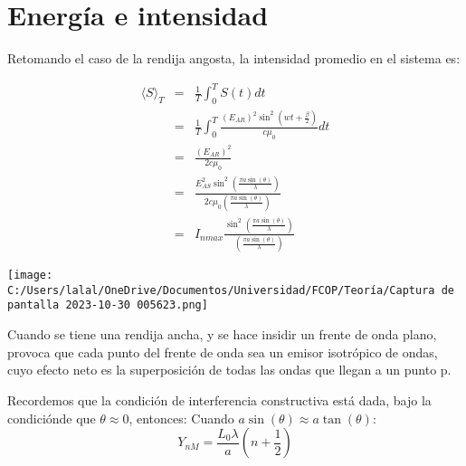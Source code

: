 \documentclass{article}
\begin{document}
        \section{Energía e intensidad}
        Retomando el caso de la rendija angosta, la intensidad 
        promedio en el sistema es:

        \begin{eqnarray}
            \langle S \rangle_T &=& 
            \frac{1}{T} \int_{0}^{T} S(t)dt\\
            &=& \frac{1}{T} \int_{0}^{T}
            \frac{(E_{AR})^2\sin^2(wt+\frac{\beta}{2})}{c\mu_0}dt\\
            &=& \frac{(E_{AR})^2}{2c\mu_0}\\
            &=& \frac{E_{AS}^2\sin^2(\frac{\pi a\sin(\theta)}{\lambda})}
            {2c\mu_0(\frac{\pi a \sin(\theta)}{\lambda})}\\
            &=& I_{nmax} \frac{\sin^2(\frac{\pi a \sin(\theta)}{\lambda})}
            {(\frac{\pi a \sin(\theta)}{\lambda})}    
        \end{eqnarray}


        \texttt{[image: C:/Users/lalal/OneDrive/Documentos/Universidad/FCOP/Teoría/Captura de pantalla 2023-10-30 005623.png]}
        
        Cuando se tiene una rendija ancha, y se hace insidir un frente de onda plano,
        provoca que cada punto del frente de onda sea un emisor isotrópico de ondas,
        cuyo efecto neto es la superposición de todas las ondas que llegan a un punto p.
        
        Recordemos que la condición de interferencia constructiva está 
    dada, bajo la condiciónde que $\theta \approx 0$, entonces:
    Cuando $a\sin(\theta) \approx a\tan(\theta)$:
    \[
        Y_{nM} = \frac{L_0\lambda}{a} \left(n + \frac{1}{2}\right)    
    \]  

        
\end{document}
